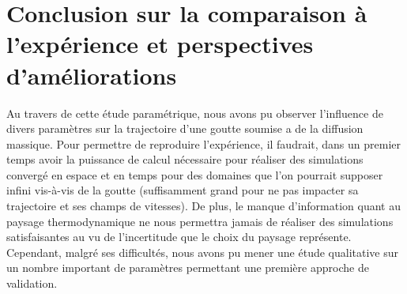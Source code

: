 \section{Conclusion sur la comparaison à l'expérience et perspectives d'améliorations}

Au travers de cette étude paramétrique, nous avons pu observer l'influence de divers paramètres sur la trajectoire d'une goutte soumise a de la diffusion massique. Pour permettre de reproduire l'expérience, il faudrait, dans un premier temps avoir la puissance de calcul nécessaire pour réaliser des simulations convergé en espace et en temps pour des domaines que l'on pourrait supposer infini vis-à-vis de la goutte (suffisamment grand pour ne pas impacter sa trajectoire et ses champs de vitesses). De plus, le manque d'information quant au paysage thermodynamique ne nous permettra jamais de réaliser des simulations satisfaisantes au vu de l'incertitude que le choix du paysage représente. Cependant, malgré ses difficultés, nous avons pu mener une étude qualitative sur un nombre important de paramètres permettant une première approche de validation.

